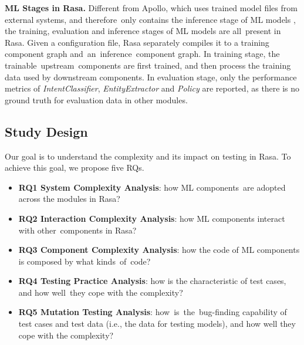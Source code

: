 \textbf{ML Stages in Rasa.} 
Different from Apollo, which uses trained model files from external systems, and therefore~only contains the inference stage of ML models \cite{pengFirstLookIntegration2020}, the training, evaluation and inference stages of ML models are all~present in Rasa. 
Given a configuration file, Rasa separately compiles it to a training component graph and~an~inference~component graph. 
In training stage, the trainable~upstream~components are first trained, and then process the training data used by downstream components. 
In evaluation stage, only the performance metrics of \textit{IntentClassifier}, \textit{EntityExtractor} and \textit{Policy} are reported, as there is no ground truth for evaluation data in other modules.




\subsection{Study Design}

Our goal is to understand the complexity and its impact on testing in Rasa. To achieve this goal, we propose five RQs. %

\begin{itemize}[leftmargin=*]
    \item \textbf{RQ1 System Complexity Analysis}: how ML components~are adopted across the modules in Rasa?
    \item \textbf{RQ2 Interaction Complexity Analysis}: how ML components interact with other~components in Rasa?
    \item \textbf{RQ3 Component Complexity Analysis}: how the code of ML components is composed by what kinds~of~code?
    \item \textbf{RQ4 Testing Practice Analysis}: how is the characteristic of test cases, and how well~they cope with the complexity?
    \item \textbf{RQ5 Mutation Testing Analysis}: how~is~the~bug-finding capability of test cases and test data (i.e., the data for testing models), and how well they cope with the complexity?
\end{itemize}

